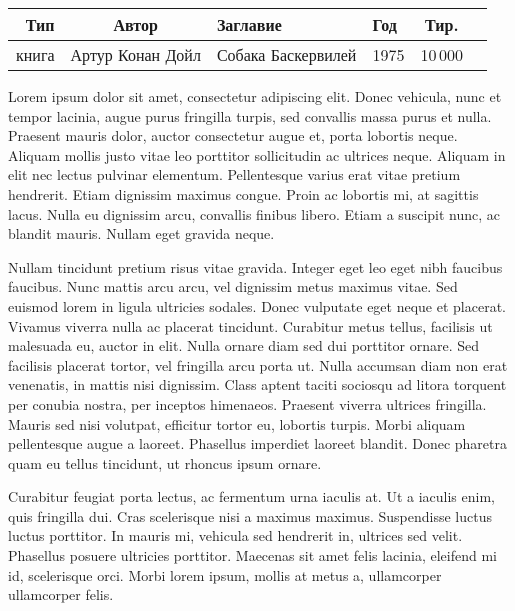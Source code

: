 \begin{table}
	\begin{tabular}{|r|c|p{}|
			p{}|c|r|}
		\hline  Тип & Автор & Заглавие & Год & Тир. \\ \hline
		книга & {Артур Конан Дойл} & {Собака Баскервилей} & 1975 & 10\,000 \\ \hline
	\end{tabular} 
\end{table}




Lorem ipsum dolor sit amet, consectetur adipiscing elit. Donec vehicula, nunc et tempor lacinia, augue purus fringilla turpis, sed convallis massa purus et nulla. Praesent mauris dolor, auctor consectetur augue et, porta lobortis neque. Aliquam mollis justo vitae leo porttitor sollicitudin ac ultrices neque. Aliquam in elit nec lectus pulvinar elementum. Pellentesque varius erat vitae pretium hendrerit. Etiam dignissim maximus congue. Proin ac lobortis mi, at sagittis lacus. Nulla eu dignissim arcu, convallis finibus libero. Etiam a suscipit nunc, ac blandit mauris. Nullam eget gravida neque.

Nullam tincidunt pretium risus vitae gravida. Integer eget leo eget nibh faucibus faucibus. Nunc mattis arcu arcu, vel dignissim metus maximus vitae. Sed euismod lorem in ligula ultricies sodales. Donec vulputate eget neque et placerat. Vivamus viverra nulla ac placerat tincidunt. Curabitur metus tellus, facilisis ut malesuada eu, auctor in elit. Nulla ornare diam sed dui porttitor ornare. Sed facilisis placerat tortor, vel fringilla arcu porta ut. Nulla accumsan diam non erat venenatis, in mattis nisi dignissim. Class aptent taciti sociosqu ad litora torquent per conubia nostra, per inceptos himenaeos. Praesent viverra ultrices fringilla. Mauris sed nisi volutpat, efficitur tortor eu, lobortis turpis. Morbi aliquam pellentesque augue a laoreet. Phasellus imperdiet laoreet blandit. Donec pharetra quam eu tellus tincidunt, ut rhoncus ipsum ornare.

Curabitur feugiat porta lectus, ac fermentum urna iaculis at. Ut a iaculis enim, quis fringilla dui. Cras scelerisque nisi a maximus maximus. Suspendisse luctus luctus porttitor. In mauris mi, vehicula sed hendrerit in, ultrices sed velit. Phasellus posuere ultricies porttitor. Maecenas sit amet felis lacinia, eleifend mi id, scelerisque orci. Morbi lorem ipsum, mollis at metus a, ullamcorper ullamcorper felis.

